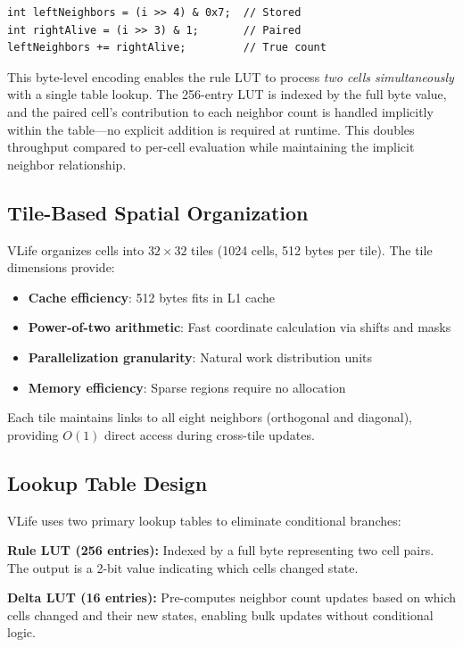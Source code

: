 \documentclass[11pt]{article}
\theoremstyle{definition}
\begin{document}
    \begin{lstlisting}
int leftNeighbors = (i >> 4) & 0x7;  // Stored
int rightAlive = (i >> 3) & 1;       // Paired
leftNeighbors += rightAlive;         // True count
    \end{lstlisting}

    This byte-level encoding enables the rule LUT to process \emph{two cells simultaneously} with a single table lookup. The 256-entry LUT is indexed by the full byte value, and the paired cell's contribution to each neighbor count is handled implicitly within the table---no explicit addition is required at runtime. This doubles throughput compared to per-cell evaluation while maintaining the implicit neighbor relationship.

    \subsection{Tile-Based Spatial Organization}

    VLife organizes cells into $32 \times 32$ tiles (1024 cells, 512 bytes per tile). The tile dimensions provide:
    \begin{itemize}
        \item \textbf{Cache efficiency}: 512 bytes fits in L1 cache
        \item \textbf{Power-of-two arithmetic}: Fast coordinate calculation via shifts and masks
        \item \textbf{Parallelization granularity}: Natural work distribution units
        \item \textbf{Memory efficiency}: Sparse regions require no allocation
    \end{itemize}

    Each tile maintains links to all eight neighbors (orthogonal and diagonal), providing $O(1)$ direct access during cross-tile updates.

    \subsection{Lookup Table Design}

    VLife uses two primary lookup tables to eliminate conditional branches:

    \textbf{Rule LUT (256 entries):} Indexed by a full byte representing two cell pairs. The output is a 2-bit value indicating which cells changed state.

    \textbf{Delta LUT (16 entries):} Pre-computes neighbor count updates based on which cells changed and their new states, enabling bulk updates without conditional logic.
\end{document}
